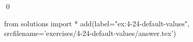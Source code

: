 
\begin{ex}
  \label{ex:4-24-default-values}
  
  \qed
\end{ex}
\begin{python0}
from solutions import *
add(label="ex:4-24-default-values",
    srcfilename='exercises/4-24-default-values/answer.tex')
\end{python0}
